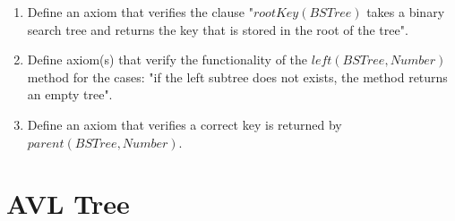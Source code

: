 \documentclass[12pt]{article}
\begin{document}
\begin{spacing}{1.5}
\begin{enumerate}
\item Define an axiom that verifies the clause "$rootKey(BSTree)$ takes a binary search tree and returns the key that is stored in the root of the tree".\\

\item Define axiom(s) that verify the functionality of the $left(BSTree, Number)$ method for the cases: "if the left subtree does not exists, the method returns an empty tree".\\

\item Define an axiom that verifies a correct key is returned by $parent(BSTree, Number)$.\\

\end{enumerate}

\newpage

\section*{AVL Tree}


\end{spacing}
\end{document}

